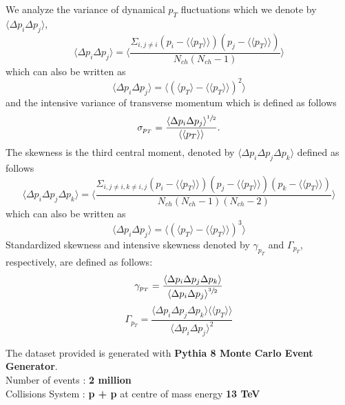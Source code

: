 \documentclass[letterpaper,aps,prc,superscriptaddress,nofootinbib,10pt,showpacs,floatfix]{revtex4-2}%
\newcommand{\bfrac}[2]{\frac{\displaystyle #1}{\displaystyle #2}}
\begin{document}
We analyze the variance of dynamical $p_T$ fluctuations which we denote by $\langle \Delta p_i \Delta p_j\rangle $,
\begin{equation}
\label{eq:2}
\langle \Delta p_i \Delta p_j \rangle =\langle \bfrac{\Sigma_{i,j\neq i} {(p_i-\langle \langle p_T\rangle \rangle )(p_j-\langle \langle p_T\rangle \rangle )}}{N_{ch}(N_{ch}-1)}\rangle 
\end{equation}
which can also be written as
\begin{equation}
\label{eq:3}
\langle \Delta p_i \Delta p_j\rangle =\langle \left(\langle p_T\rangle -\langle \langle p_T\rangle \rangle \right)^2\rangle 
\end{equation}
and the intensive variance of transverse momentum which is defined as follows
\begin{equation}
\label{eq:4}
\sigma_{p_T}=\bfrac{\langle \Delta p_i \Delta p_j\rangle ^{\sfrac{1}{2}}}{\langle \langle p_T\rangle \rangle }.
\end{equation}
The skewness is the third central moment, denoted by $\langle \Delta p_i \Delta p_j \Delta p_k\rangle $ defined as follows
\begin{equation}
\label{eq:5}
\langle \Delta p_i \Delta p_j \Delta p_k\rangle =\langle \bfrac{\Sigma_{i,j\neq i, k\neq i,j} {(p_i-\langle \langle p_T\rangle \rangle )(p_j-\langle \langle p_T\rangle \rangle )(p_k-\langle \langle p_T\rangle \rangle )}}{N_{ch}(N_{ch}-1)(N_{ch}-2)}\rangle 
\end{equation}
which can also be written as
\begin{equation}
\label{eq:6}
\langle \Delta p_i \Delta p_j\rangle =\langle \left(\langle p_T\rangle -\langle \langle p_T\rangle \rangle \right)^3\rangle 
\end{equation}
Standardized skewness and intensive skewness denoted by $\gamma_{p_T}$ and $\Gamma_{p_T}$, respectively, are defined as follows:
\begin{equation}
\label{eq:7}
\gamma_{p_T}=\bfrac{\langle \Delta p_i \Delta p_j \Delta p_k\rangle }{\langle \Delta p_i \Delta p_j\rangle ^{\sfrac{3}{2}}}
\end{equation}
\begin{equation}
\label{eq:8}
\Gamma_{p_T}= \bfrac{\langle \Delta p_i \Delta p_j \Delta p_k\rangle \langle \langle p_T\rangle \rangle }{\langle \Delta p_i \Delta p_j\rangle ^2}
\end{equation}


The dataset provided is generated with \textbf{Pythia 8 Monte Carlo Event Generator}. \\
Number of events :  \textbf{2 million} \\
Collisions System :  \textbf{p + p} at centre of mass energy \textbf{13 TeV}\\
\end{document}
